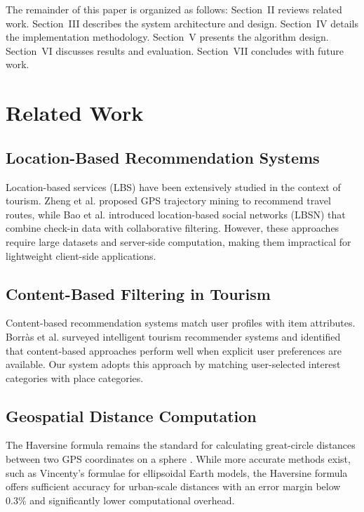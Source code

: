 \documentclass[conference]{IEEEtran}
\begin{document}
The remainder of this paper is organized as follows: Section~II reviews related work. Section~III describes the system architecture and design. Section~IV details the implementation methodology. Section~V presents the algorithm design. Section~VI discusses results and evaluation. Section~VII concludes with future work.

\section{Related Work}

\subsection{Location-Based Recommendation Systems}

Location-based services (LBS) have been extensively studied in the context of tourism. Zheng et al. \cite{zheng2009} proposed GPS trajectory mining to recommend travel routes, while Bao et al. \cite{bao2015} introduced location-based social networks (LBSN) that combine check-in data with collaborative filtering. However, these approaches require large datasets and server-side computation, making them impractical for lightweight client-side applications.

\subsection{Content-Based Filtering in Tourism}

Content-based recommendation systems match user profiles with item attributes. Borr\`{a}s et al. \cite{borras2014} surveyed intelligent tourism recommender systems and identified that content-based approaches perform well when explicit user preferences are available. Our system adopts this approach by matching user-selected interest categories with place categories.

\subsection{Geospatial Distance Computation}

The Haversine formula remains the standard for calculating great-circle distances between two GPS coordinates on a sphere \cite{sinnott1984}. While more accurate methods exist, such as Vincenty's formulae for ellipsoidal Earth models, the Haversine formula offers sufficient accuracy for urban-scale distances with an error margin below 0.3\% and significantly lower computational overhead.
\end{document}
